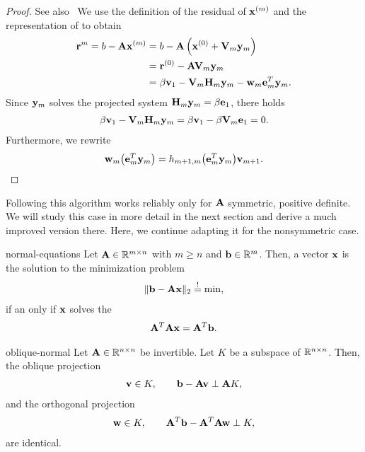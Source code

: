 \begin{proof}
  See also~\cite[Proposition 6.7]{Saad00}
  We use the definition of the residual of $\mathbf x^{(m)}$ and the representation of  to obtain
  \begin{align}
    \mathbf r^{m} = b-\mathbf A\mathbf x^{(m)}
    &= b- \mathbf A\left(\mathbf x^{(0)} + \mathbf V_m\mathbf y_m\right)\\
    &=\mathbf r^{(0)} - \mathbf A\mathbf V_m\mathbf y_m\\
    &= \beta\mathbf v_1 - \mathbf V_m\mathbf H_m\mathbf y_m - \mathbf w_m\mathbf e_m^T\mathbf y_m.
  \end{align}
  Since $\mathbf y_m$ solves the projected system
  $\mathbf H_m\mathbf y_m = \beta\mathbf e_1$, there holds
  \begin{gather}
    \beta\mathbf v_1 - \mathbf V_m\mathbf H_m\mathbf y_m = \beta\mathbf v_1 - \beta \mathbf V_m\mathbf e_1 = 0.
  \end{gather}
  Furthermore, we rewrite
  \begin{gather}
    \mathbf w_m\bigl(\mathbf e_m^T\mathbf y_m\bigr) = h_{m+1,m} \bigl(\mathbf e_m^T\mathbf y_m\bigr) \mathbf v_{m+1}.
  \end{gather}
\end{proof}

\begin{remark}
  Following  this algorithm
  works reliably only for $\mathbf A$ symmetric, positive definite. We
  will study this case in more detail in the next section and derive a
  much improved version there. Here, we continue adapting it for the
  nonsymmetric case.
\end{remark}

\begin{Theorem}{normal-equations}
  Let $\mathbf A\in\mathbb R^{m\times n}$ with $m\ge n$ and $\mathbf b\in\mathbb R^m$. Then, a vector $\mathbf x$ is the solution to the minimization problem
  \begin{gather}
    \lVert\mathbf b-\mathbf A\mathbf x\rVert_2 \stackrel{!}{=} \min,
  \end{gather}
  if an only if $\mathbf x$ solves the 
  \begin{gather}
    \mathbf A^T\mathbf A\mathbf x = \mathbf A^T \mathbf b.
  \end{gather}
\end{Theorem}

\begin{Lemma}{oblique-normal}
  Let $\mathbf A\in\mathbb R^{n\times n}$ be invertible. Let $K$ be a subspace of $\mathbb R^{n\times n}$. Then, the oblique projection
  \begin{gather}
    \mathbf v\in K, \qquad \mathbf b-\mathbf A\mathbf v \perp \mathbf A K,
  \end{gather}
  and the orthogonal projection
  \begin{gather}
    \mathbf w\in K, \qquad \mathbf A^T \mathbf b-\mathbf A^T\mathbf A\mathbf w \perp K,
  \end{gather}
  are identical.
\end{Lemma}

